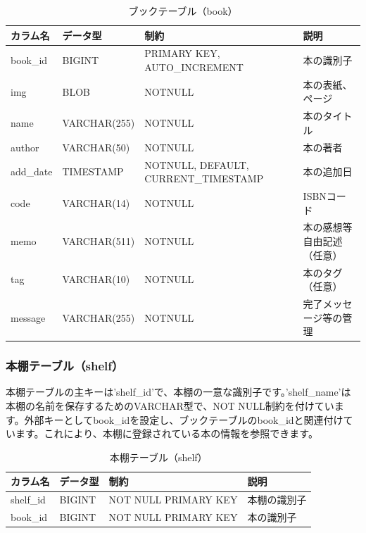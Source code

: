 \documentclass[a4paper, 11pt, titlepage]{jsarticle}
\begin{document}
\begin{table}[htbp]
  \centering
  \begin{tabular}{|l|l|>{\centering\arraybackslash}m{4cm}|>{\centering\arraybackslash}m{3cm}|}
    \hline
    \textbf{カラム名} & \textbf{データ型} & \textbf{制約} & \textbf{説明} \\
    \hline\hline
    book\_id & BIGINT & PRIMARY KEY, AUTO\_INCREMENT & 本の識別子 \\
    \hline
    img & BLOB & NOTNULL & 本の表紙、ページ \\
    \hline
    name & VARCHAR(255) & NOTNULL & 本のタイトル \\
    \hline
    author & VARCHAR(50) & NOTNULL & 本の著者 \\
    \hline
    add\_date & TIMESTAMP & NOTNULL, DEFAULT, CURRENT\_TIMESTAMP & 本の追加日 \\
    \hline
    code & VARCHAR(14) & NOTNULL & ISBNコード \\
    \hline
    memo & VARCHAR(511) & NOTNULL & 本の感想等自由記述（任意） \\
    \hline
    tag & VARCHAR(10) & NOTNULL & 本のタグ（任意） \\
    \hline
    message & VARCHAR(255) & NOTNULL & 完了メッセージ等の管理 \\
    \hline
  \end{tabular}
  \caption{ブックテーブル（book）}
  \label{tab:booktable}
\end{table}

\subsubsection{本棚テーブル（shelf）}
本棚テーブルの主キーは'shelf\_id'で、本棚の一意な識別子です。'shelf\_name'は本棚の名前を保存するためのVARCHAR型で、NOT NULL制約を付けています。外部キーとしてbook\_idを設定し、ブックテーブルのbook\_idと関連付けています。これにより、本棚に登録されている本の情報を参照できます。
\begin{table}[htbp]
  \centering
  \begin{tabular}{|l|l|>{\centering\arraybackslash}m{4cm}|>{\centering\arraybackslash}m{3cm}|}
    \hline
    \textbf{カラム名} & \textbf{データ型} & \textbf{制約} & \textbf{説明} \\
    \hline\hline
    shelf\_id & BIGINT & NOT NULL PRIMARY KEY& 本棚の識別子 \\
    \hline
    book\_id & BIGINT & NOT NULL PRIMARY KEY& 本の識別子 \\
    \hline
  \end{tabular}
  \caption{本棚テーブル（shelf）}
  \label{tab:shelftable}
\end{table}
\end{document}
